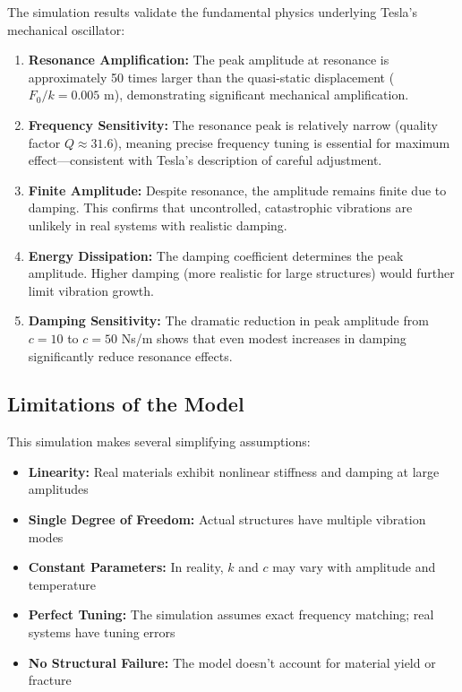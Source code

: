 \documentclass[12pt,a4paper]{article}
\begin{document}
The simulation results validate the fundamental physics underlying Tesla's mechanical oscillator:

\begin{enumerate}
\item \textbf{Resonance Amplification:} The peak amplitude at resonance is approximately 50 times larger than the quasi-static displacement ($F_0/k = 0.005$ m), demonstrating significant mechanical amplification.

\item \textbf{Frequency Sensitivity:} The resonance peak is relatively narrow (quality factor $Q \approx 31.6$), meaning precise frequency tuning is essential for maximum effect---consistent with Tesla's description of careful adjustment.

\item \textbf{Finite Amplitude:} Despite resonance, the amplitude remains finite due to damping. This confirms that uncontrolled, catastrophic vibrations are unlikely in real systems with realistic damping.

\item \textbf{Energy Dissipation:} The damping coefficient determines the peak amplitude. Higher damping (more realistic for large structures) would further limit vibration growth.

\item \textbf{Damping Sensitivity:} The dramatic reduction in peak amplitude from $c=10$ to $c=50$ Ns/m shows that even modest increases in damping significantly reduce resonance effects.
\end{enumerate}

\subsection*{Limitations of the Model}

This simulation makes several simplifying assumptions:
\begin{itemize}
\item \textbf{Linearity:} Real materials exhibit nonlinear stiffness and damping at large amplitudes
\item \textbf{Single Degree of Freedom:} Actual structures have multiple vibration modes
\item \textbf{Constant Parameters:} In reality, $k$ and $c$ may vary with amplitude and temperature
\item \textbf{Perfect Tuning:} The simulation assumes exact frequency matching; real systems have tuning errors
\item \textbf{No Structural Failure:} The model doesn't account for material yield or fracture
\end{itemize}
\end{document}
